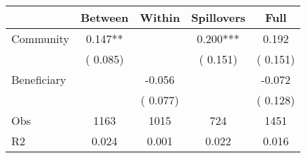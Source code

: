 
\begin{tabular}{l*{4}{c}}\hline&\multicolumn{1}{c}{Between}&\multicolumn{1}{c}{Within}&\multicolumn{1}{c}{Spillovers}&\multicolumn{1}{c}{Full}\\ \hline
 Community             &              0.147**      &                                               &        0.200*** &         0.192                            \\ 
                               &        (       0.085)           &                                       &       (       0.151)     &      (       0.151)                                           \\ 
 Beneficiary   &                                               &       -0.056    &                                &            -0.072                            \\ 
                               &                                               & (       0.077)                  &                                        &      (       0.128)                                           \\ 
\hline                                                                                                                                                                                                                                            
 Obs                   &               1163               &       1015                       &       724                &              1451                                               \\ 
 R2                    &                      0.024              &              0.001                      &              0.022               &                     0.016                                              \\ 
\hline \end{tabular}                                                                                                                                                                                                              